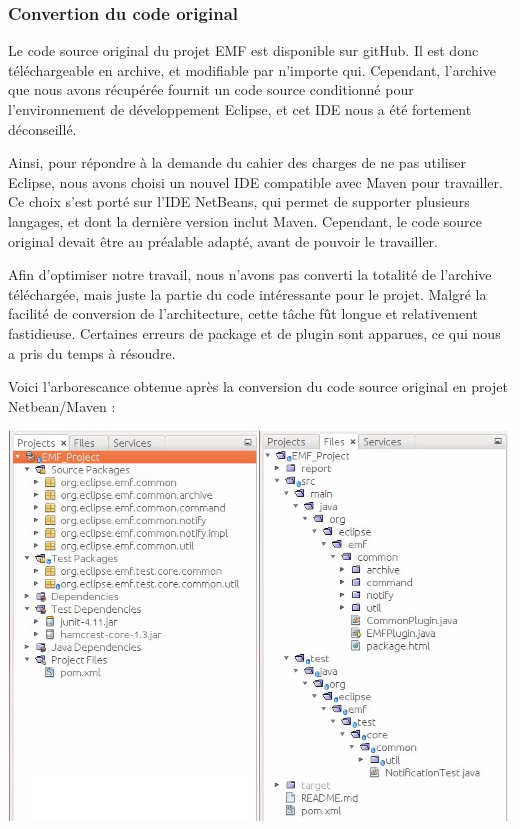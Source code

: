 \documentclass[a4paper]{article}
\begin{document}
		\vspace{0.5cm}

		\subsubsection{Convertion du code original}

		\vspace{0.5cm}

		Le code source original du projet EMF est disponible sur gitHub. Il est donc téléchargeable en archive, et modifiable par n'importe qui. Cependant, l'archive que nous avons récupérée fournit un code source conditionné pour l'environnement de développement Eclipse, et cet IDE nous a été fortement déconseillé.

		\vspace{0.5cm}

		Ainsi, pour répondre à la demande du cahier des charges de ne pas utiliser Eclipse, nous avons choisi un nouvel IDE compatible avec Maven pour travailler. Ce choix s'est porté sur l'IDE NetBeans, qui permet de supporter plusieurs langages, et dont la dernière version inclut Maven. Cependant, le code source original devait être au préalable adapté, avant de pouvoir le travailler.

		\vspace{0.5cm}

		Afin d'optimiser notre travail, nous n'avons pas converti la totalité de l'archive téléchargée, mais juste la partie du code intéressante pour le projet. Malgré la facilité de conversion de l'architecture, cette tâche fût longue et relativement fastidieuse. Certaines erreurs de package et de plugin sont apparues, ce qui nous a pris du temps à résoudre. 

		\vspace{0.5cm}

		Voici l'arborescance obtenue après la conversion du code source original en projet Netbean/Maven : 

		\begin{center}
			\includegraphics[width=1.0\textwidth]{Arborescence.jpg}~\\
		\end{center}
\end{document}
